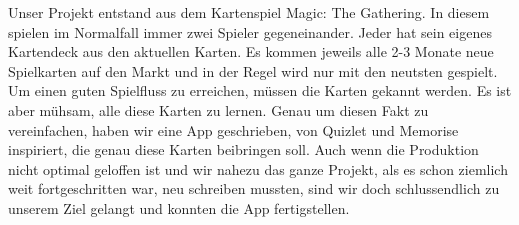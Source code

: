 Unser Projekt entstand aus dem Kartenspiel Magic: The Gathering. In diesem spielen im Normalfall immer zwei Spieler gegeneinander. Jeder hat sein eigenes Kartendeck aus den aktuellen Karten. Es kommen jeweils alle 2-3 Monate neue Spielkarten auf den Markt und in der Regel wird nur mit den neutsten gespielt. Um einen guten Spielfluss zu erreichen, müssen die Karten gekannt werden. Es ist aber mühsam, alle diese Karten zu lernen. Genau um diesen Fakt zu vereinfachen, haben wir eine App geschrieben, von Quizlet und Memorise inspiriert, die genau diese Karten beibringen soll. Auch wenn die Produktion nicht optimal geloffen ist und wir nahezu das ganze Projekt, als es schon ziemlich weit fortgeschritten war, neu schreiben mussten, sind wir doch schlussendlich zu unserem Ziel gelangt und konnten die App fertigstellen.